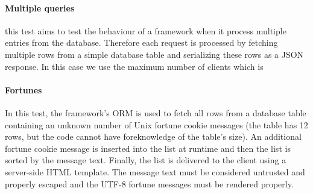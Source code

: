 \paragraph{Multiple queries}
this test aims to test the behaviour of a framework when it process multiple entries from the database.
Therefore each request is processed by fetching multiple rows from a simple database table and serializing these rows as a JSON response.
In this case we use the maximum number of clients which is 
\paragraph{Fortunes}
In this test, the framework's ORM is used to fetch all rows from a database table containing an unknown number of Unix fortune cookie messages (the table has 12 rows, but the code cannot have foreknowledge of the table's size). An additional fortune cookie message is inserted into the list at runtime and then the list is sorted by the message text. Finally, the list is delivered to the client using a server-side HTML template. The message text must be considered untrusted and properly escaped and the UTF-8 fortune messages must be rendered properly.

